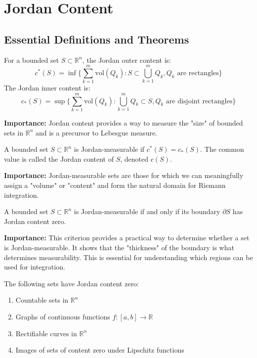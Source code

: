 \section{Jordan Content}

\subsection*{Essential Definitions and Theorems}

\begin{definition}
For a bounded set $S \subset \mathbb{R}^n$, the Jordan outer content is:
\[c^*(S) = \inf\{\sum_{k=1}^m \text{vol}(Q_k) : S \subset \bigcup_{k=1}^m Q_k, Q_k \text{ are rectangles}\}\]
The Jordan inner content is:
\[c_*(S) = \sup\{\sum_{k=1}^m \text{vol}(Q_k) : \bigcup_{k=1}^m Q_k \subset S, Q_k \text{ are disjoint rectangles}\}\]
\end{definition}

\noindent\textbf{Importance:} Jordan content provides a way to measure the "size" of bounded sets in $\mathbb{R}^n$ and is a precursor to Lebesgue measure.

\begin{definition}
A bounded set $S \subset \mathbb{R}^n$ is Jordan-measurable if $c^*(S) = c_*(S)$. The common value is called the Jordan content of $S$, denoted $c(S)$.
\end{definition}

\noindent\textbf{Importance:} Jordan-measurable sets are those for which we can meaningfully assign a "volume" or "content" and form the natural domain for Riemann integration.

\begin{theorem}
A bounded set $S \subset \mathbb{R}^n$ is Jordan-measurable if and only if its boundary $\partial S$ has Jordan content zero.
\end{theorem}

\noindent\textbf{Importance:} This criterion provides a practical way to determine whether a set is Jordan-measurable. It shows that the "thickness" of the boundary is what determines measurability. This is essential for understanding which regions can be used for integration.



\begin{theorem}
The following sets have Jordan content zero:
\begin{enumerate}[label=(\alph*)]
\item Countable sets in $\mathbb{R}^n$
\item Graphs of continuous functions $f: [a, b] \to \mathbb{R}$
\item Rectifiable curves in $\mathbb{R}^n$
\item Images of sets of content zero under Lipschitz functions
\end{enumerate}
\end{theorem}

